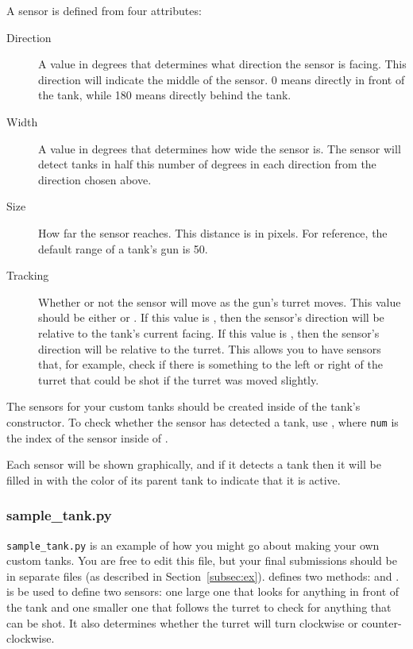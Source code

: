 \documentclass[11pt]{cselabheader}
\begin{document}
A sensor is defined from four attributes:
\begin{description}
\item[Direction] A value in degrees that determines what direction the sensor
    is facing. This direction will indicate the middle of the sensor. 0 means
    directly in front of the tank, while 180 means directly behind the tank.
\item[Width] A value in degrees that determines how wide the sensor is. The
    sensor will detect tanks in half this number of degrees in each direction
    from the direction chosen above.
\item[Size] How far the sensor reaches. This distance is in pixels. For
    reference, the default range of a tank's gun is 50.
\item[Tracking] Whether or not the sensor will move as the gun's turret moves.
    This value should be either  or . If
    this value is , then the sensor's direction will be
    relative to the tank's current facing. If this value is ,
    then the sensor's direction will be relative to the turret. This allows you
    to have sensors that, for example, check if there is something to the left
    or right of the turret that could be shot if the turret was moved slightly.
\end{description}

The sensors for your custom tanks should be created inside of the tank's
constructor. To check whether the sensor has detected a tank, use
, where \texttt{num} is the index of the
sensor inside of .

Each sensor will be shown graphically, and if it detects a tank then it will be
filled in with the color of its parent tank to indicate that it is active.


\subsubsection{sample\_tank.py}
\texttt{sample\_tank.py} is an example of how you might go about making your own
custom tanks. You are free to edit this file, but your final submissions should
be in separate files (as described in Section~\ref{subsec:ex}).
 defines two methods:  and
.  is be used to
define two sensors: one large one that looks for anything in front of the tank
and one smaller one that follows the turret to check for anything that can be
shot. It also determines whether the turret will turn clockwise or
counter-clockwise.
\end{document}
